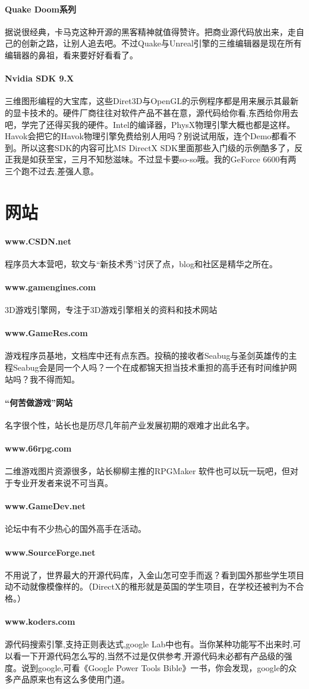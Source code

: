 \documentclass[UTF8,a4paper,8pt]{ctexart}
\begin{document}
\paragraph{Quake Doom系列}
据说很经典，卡马克这种开源的黑客精神就值得赞许。把商业源代码放出来，走自己的创新之路，让别人追去吧。不过Quake与Unreal引擎的三维编辑器是现在所有编辑器的鼻祖，看来要好好看看了。
\paragraph{Nvidia SDK 9.X}
三维图形编程的大宝库，这些Diret3D与OpenGL的示例程序都是用来展示其最新的显卡技术的。硬件厂商往往对软件产品不甚在意，源代码给你看,东西给你用去吧，学完了还得买我的硬件。Intel的编译器，PhysX物理引擎大概也都是这样。Havok会把它的Havok物理引擎免费给别人用吗？别说试用版，连个Demo都看不到。所以这套SDK的内容可比MS DirectX SDK里面那些入门级的示例酷多了，反正我是如获至宝，三月不知愁滋味。不过显卡要so-so哦。我的GeForce 6600有两三个跑不过去,差强人意。
\section{网站}
\paragraph{www.CSDN.net}
程序员大本营吧，软文与“新技术秀”讨厌了点，blog和社区是精华之所在。
\paragraph{www.gamengines.com}
3D游戏引擎网，专注于3D游戏引擎相关的资料和技术网站
\paragraph{www.GameRes.com}
游戏程序员基地，文档库中还有点东西。投稿的接收者Seabug与圣剑英雄传的主程Seabug会是同一个人吗？一个在成都锦天担当技术重担的高手还有时间维护网站吗？我不得而知。
\paragraph{“何苦做游戏”网站}
名字很个性，站长也是历尽几年前产业发展初期的艰难才出此名字。
\paragraph{www.66rpg.com}
二维游戏图片资源很多，站长柳柳主推的RPGMaker 软件也可以玩一玩吧，但对于专业开发者来说不可当真。
\paragraph{www.GameDev.net}
论坛中有不少热心的国外高手在活动。
\paragraph{www.SourceForge.net}
不用说了，世界最大的开源代码库，入金山怎可空手而返？看到国外那些学生项目动不动就像模像样的。（DirectX的稚形就是英国的学生项目，在学校还被判为不合格。）
\paragraph{www.koders.com}
源代码搜索引擎,支持正则表达式,google Lab中也有。当你某种功能写不出来时,可以看一下开源代码怎么写的,当然不过是仅供参考,开源代码未必都有产品级的强度。说到google,可看《Google Power Tools Bible》一书，你会发现，google的众多产品原来也有这么多使用门道。
\end{document}
